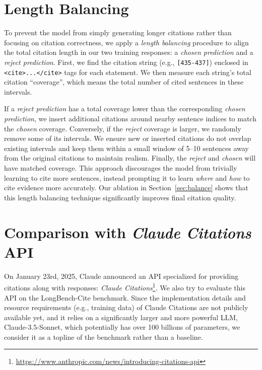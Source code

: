 \section{Length Balancing}
\label{appx:length}

To prevent the model from simply generating longer citations rather than focusing on citation correctness, we apply a \emph{length balancing} procedure to align the total citation length in our two training responses: a \emph{chosen prediction} and a \emph{reject prediction}. First, we find the citation string (e.g., \texttt{[435-437]}) enclosed in \texttt{<cite>...</cite>} tags for each statement. We then measure each string’s total citation ``coverage'', which means the total number of cited sentences in these intervals.

If a \emph{reject prediction} has a total coverage lower than the corresponding \emph{chosen prediction}, we insert additional citations around nearby sentence indices to match the \emph{chosen} coverage. Conversely, if the \emph{reject} coverage is larger, we randomly remove some of its intervals. We ensure new or inserted citations do not overlap existing intervals and keep them within a small window of 5–10 sentences away from the original citations to maintain realism. Finally, the \emph{reject} and \emph{chosen} will have matched coverage. This approach discourages the model from trivially learning to cite more sentences, instead prompting it to learn \emph{where} and \emph{how} to cite evidence more accurately. Our ablation in Section~\ref{sec:balance} shows that this length balancing technique significantly improves final citation quality.

\section{Comparison with \emph{Claude Citations} API}
\label{appx:claude}

On January 23rd, 2025, Claude announced an API specialized for providing citations along with responses: \emph{Claude Citations}\footnote{\url{https://www.anthropic.com/news/introducing-citations-api}}. We also try to evaluate this API on the LongBench-Cite benchmark. Since the implementation details and resource requirements (e.g., training data) of Claude Citations are not publicly available yet, and it relies on a significantly larger and more powerful LLM, Claude-3.5-Sonnet, which potentially has over 100 billions of parameters, we consider it as a topline of the benchmark rather than a baseline.

